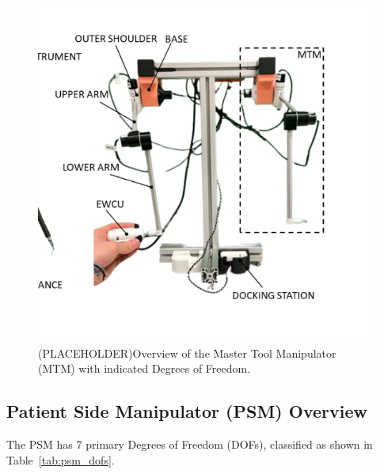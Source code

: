 \begin{figure}[htb!] %
    \centering
    \includegraphics[width=1.0\linewidth]{figures/mtm_dofs.png} %
    \caption{(PLACEHOLDER)Overview of the Master Tool Manipulator (MTM) with indicated Degrees of Freedom.}
    \label{fig:mtm_dofs}
\end{figure}

\subsection{Patient Side Manipulator (PSM) Overview}

The PSM has 7 primary Degrees of Freedom (DOFs), classified as shown in Table~\ref{tab:psm_dofs}.


